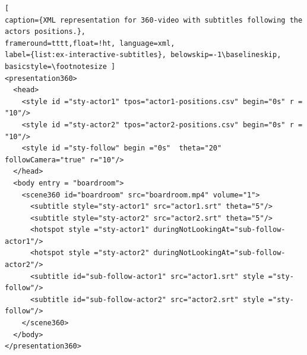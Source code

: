 \begin{lstlisting}[
caption={XML representation for 360-video with subtitles following the actors positions.},
frameround=tttt,float=!ht, language=xml, 
label={list:ex-interactive-subtitles}, belowskip=-1\baselineskip, basicstyle=\footnotesize ]
<presentation360>
  <head>
    <style id ="sty-actor1" tpos="actor1-positions.csv" begin="0s" r = "10"/>
    <style id ="sty-actor2" tpos="actor2-positions.csv" begin="0s" r = "10"/>
    <style id ="sty-follow" begin ="0s"  theta="20" followCamera="true" r="10"/>
  </head>
  <body entry = "boardroom">
    <scene360 id="boardroom" src="boardroom.mp4" volume="1">      
      <subtitle style="sty-actor1" src="actor1.srt" theta="5"/>      
      <subtitle style="sty-actor2" src="actor2.srt" theta="5"/>
      <hotspot style ="sty-actor1" duringNotLookingAt="sub-follow-actor1"/>
      <hotspot style ="sty-actor2" duringNotLookingAt="sub-follow-actor2"/>
      <subtitle id="sub-follow-actor1" src="actor1.srt" style ="sty-follow"/>
      <subtitle id="sub-follow-actor2" src="actor2.srt" style ="sty-follow"/>
    </scene360>
  </body>
</presentation360>
\end{lstlisting}
